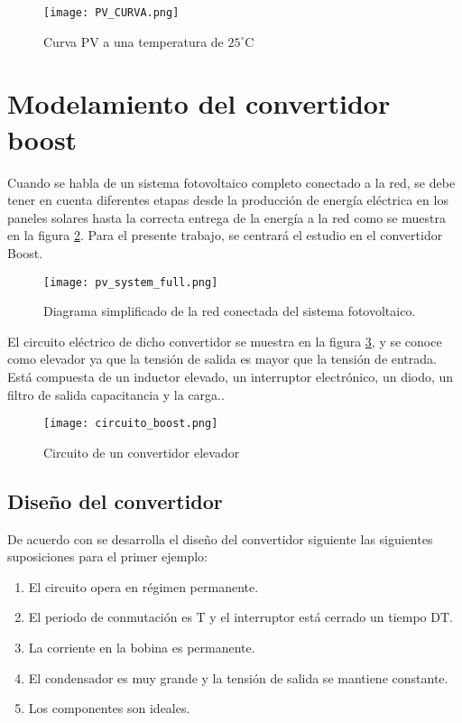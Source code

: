 \documentclass[10pt,twocolumn]{article}
\begin{document}
\begin{figure}[h!]
    \centering
    \texttt{[image: PV\_CURVA.png]}
    \caption{Curva PV a una temperatura de $25^{\circ}$C}
    \label{curva_PV}
\end{figure}

\section{Modelamiento del convertidor boost}

Cuando se habla de un sistema fotovoltaico completo conectado a la red, se debe tener en cuenta diferentes etapas desde la producción de energía eléctrica en los paneles solares hasta la correcta entrega de la energía a la red como se muestra en la figura \ref{pv_system_full}. Para el presente trabajo, se centrará el estudio en el convertidor Boost.

\begin{figure}[h!]
    \centering
    \texttt{[image: pv\_system\_full.png]}
    \caption{Diagrama simplificado de la red conectada del sistema fotovoltaico.}
    \label{pv_system_full}
\end{figure}

El circuito eléctrico de dicho convertidor se muestra en la figura \ref{circuito_boost}, y se conoce como elevador ya que la tensión de salida es mayor que la tensión de entrada. Está compuesta de un inductor elevado, un interruptor electrónico, un diodo, un filtro de salida capacitancia y la carga.\cite{pradipkumar2013design}.

 \begin{figure}[h]
	\centering
	\texttt{[image: circuito\_boost.png]}
	\caption{Circuito de un convertidor elevador}
	\label{circuito_boost}
\end{figure}

\subsection{Diseño del convertidor}

De acuerdo con \cite{mohan2009electronica} se desarrolla el diseño del convertidor siguiente las siguientes suposiciones para el primer ejemplo: 

\begin{enumerate}
	\item El circuito opera en régimen permanente.
	\item El periodo de conmutación es T y el interruptor está cerrado un tiempo DT.
	\item La corriente en la bobina es permanente.
	\item El condensador es muy grande y la tensión de salida se mantiene constante.
	\item Los componentes son ideales.
\end{enumerate}
\end{document}
